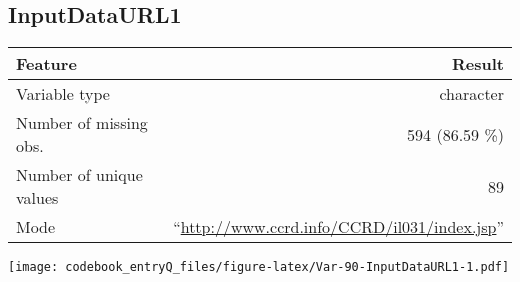 \documentclass[]{article}
\newcommand{\fullline}{\noindent\makebox[\linewidth]{\rule{\textwidth}{0.4pt}}}
\newcommand{\bminione}{\begin{minipage}{0.75 \textwidth}}
\newcommand{\bminitwo}{\begin{minipage}{0.25 \textwidth}}
\newcommand{\emini}{\end{minipage}}
\begin{document}
\fullline

\hypertarget{inputdataurl1}{\subsection{InputDataURL1}\label{inputdataurl1}}

\bminione

\begin{longtable}[]{@{}lr@{}}
\toprule
\begin{minipage}[b]{0.34\columnwidth}\raggedright\strut
Feature\strut
\end{minipage} & \begin{minipage}[b]{0.59\columnwidth}\raggedleft\strut
Result\strut
\end{minipage}\tabularnewline
\midrule
\endhead
\begin{minipage}[t]{0.34\columnwidth}\raggedright\strut
Variable type\strut
\end{minipage} & \begin{minipage}[t]{0.59\columnwidth}\raggedleft\strut
character\strut
\end{minipage}\tabularnewline
\begin{minipage}[t]{0.34\columnwidth}\raggedright\strut
Number of missing obs.\strut
\end{minipage} & \begin{minipage}[t]{0.59\columnwidth}\raggedleft\strut
594 (86.59 \%)\strut
\end{minipage}\tabularnewline
\begin{minipage}[t]{0.34\columnwidth}\raggedright\strut
Number of unique values\strut
\end{minipage} & \begin{minipage}[t]{0.59\columnwidth}\raggedleft\strut
89\strut
\end{minipage}\tabularnewline
\begin{minipage}[t]{0.34\columnwidth}\raggedright\strut
Mode\strut
\end{minipage} & \begin{minipage}[t]{0.59\columnwidth}\raggedleft\strut
``\url{http://www.ccrd.info/CCRD/il031/index.jsp}''\strut
\end{minipage}\tabularnewline
\bottomrule
\end{longtable}

\emini
\bminitwo
\texttt{[image: codebook\_entryQ\_files/figure-latex/Var-90-InputDataURL1-1.pdf]}
\emini
\end{document}
